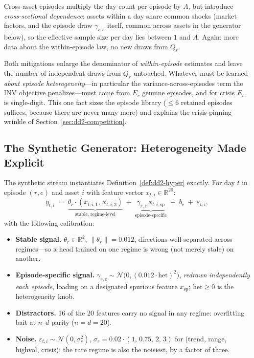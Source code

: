 \documentclass[11pt,a4paper]{article}
\theoremstyle{definition}
\theoremstyle{plain}
\newcommand{\R}{\mathbb{R}}
\begin{document}
Cross-asset episodes multiply the day count per episode by $A$, but
introduce \emph{cross-sectional dependence}: assets within a day share
common shocks (market factors, and the episode draw $\gamma_{r,e}$ itself,
common across assets in the generator below), so the effective sample size
per day lies between $1$ and $A$. Again: more data about the within-episode
law, no new draws from $Q_r$.

\begin{keypoint}
Both mitigations enlarge the denominator of \emph{within-episode} estimates
and leave the number of independent draws from $Q_r$ untouched. Whatever
must be learned \emph{about episode heterogeneity}---in particular the
variance-across-episodes term the INV objective penalizes---must come from
$E_r$ genuine episodes, and for \textsf{crisis} $E_r$ is single-digit. This
one fact sizes the episode library ($\le 6$ retained episodes suffices,
because there are never many more) and explains the crisis-pinning wrinkle
of Section~\ref{sec:dd2-competition}.
\end{keypoint}

\subsection{The Synthetic Generator: Heterogeneity Made Explicit}
\label{sec:dd2-generator}

The synthetic stream instantiates Definition~\ref{def:dd2-hyper} exactly. For
day $t$ in episode $(r,e)$ and asset $i$ with feature vector
$x_{t,i} \in \R^{20}$:
\begin{equation}
\label{eq:dd2-generator}
y_{t,i} \;=\;
\underbrace{\theta_r \cdot (x_{t,i,1},\, x_{t,i,2})}_{\text{stable, regime-level}}
\;+\;
\underbrace{\gamma_{r,e}\, x_{t,i,\mathrm{sp}}}_{\text{episode-specific}}
\;+\; b_r \;+\; \varepsilon_{t,i},
\end{equation}
with the following calibration:
\begin{itemize}
  \item \textbf{Stable signal.} $\theta_r \in \R^2$, $\|\theta_r\| = 0.012$,
        directions well-separated across regimes---so a head trained on one
        regime is wrong (not merely stale) on another.
  \item \textbf{Episode-specific signal.}
        $\gamma_{r,e} \sim \mathcal{N}\bigl(0, (0.012 \cdot \mathrm{het})^2\bigr)$,
        \emph{redrawn independently each episode}, loading on a designated
        spurious feature $x_{\mathrm{sp}}$; $\mathrm{het} \ge 0$ is the
        heterogeneity knob.
  \item \textbf{Distractors.} 16 of the 20 features carry no signal in any
        regime: overfitting bait at $n$--$d$ parity ($n = d = 20$).
  \item \textbf{Noise.} $\varepsilon_{t,i} \sim \mathcal{N}(0, \sigma_r^2)$,
        $\sigma_r = 0.02 \cdot (1,\, 0.75,\, 2,\, 3)$ for
        (\textsf{trend}, \textsf{range}, \textsf{highvol}, \textsf{crisis}):
        the rare regime is also the noisiest, by a factor of three.
\end{itemize}
\end{document}
